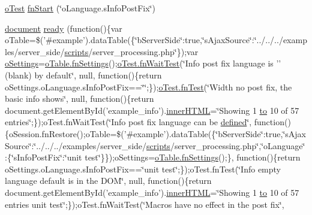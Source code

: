 \begin{DoxyCompactItemize}
\item 
\hyperlink{unit__test_8js_a3b2d259e2df3b6860d9047a92d09d0d6}{o\+Test} \hyperlink{4__server-side_2o_language_8s_info_post_fix_8js_a5a253c9710888be557d2745521cfb2e2}{fn\+Start} (\char`\"{}o\+Language.\+s\+Info\+Post\+Fix\char`\"{})
\item 
\hyperlink{outside_events_8js_aa14f8e0338cced6720590fd2ea13bd4b}{document} \hyperlink{4__server-side_2o_language_8s_info_post_fix_8js_a5b2040388b82b2aaf0cf84f047801834}{ready} (function()\{var o\+Table=\$('\#example').data\+Table(\{\char`\"{}b\+Server\+Side\char`\"{}\+:true,\char`\"{}s\+Ajax\+Source\char`\"{}\+:\char`\"{}../../../examples/server\+\_\+side/\hyperlink{tinymce_8jquery_8dev_8js_a09066d4d580eeec222f858d588b4cdef}{scripts}/server\+\_\+processing.\+php\char`\"{}\});var \hyperlink{model_8settings_8js_a4857b9c813b4dea010668e9555d0aca7}{o\+Settings}=\hyperlink{api_8methods_8js_a78f387fab92a85c2cb7830bc5d8a6141}{o\+Table.\+fn\+Settings}();\hyperlink{onhold_24__server-side_2__zero__config_8js_ab25c4d596771c0133cdc45178ce72c3d}{o\+Test.\+fn\+Wait\+Test}(\char`\"{}Info post fix language is '' (blank) by default\char`\"{}, null, function()\{return o\+Settings.\+o\+Language.\+s\+Info\+Post\+Fix==\char`\"{}\char`\"{};\});\hyperlink{__zero__config__objects__subarrays_8js_a7f100cfe8617a03cd30c47b5e15396a4}{o\+Test.\+fn\+Test}(\char`\"{}Width no post fix, the basic info shows\char`\"{}, null, function()\{return document.\+get\+Element\+By\+Id('example\+\_\+info').\hyperlink{jquery-ui_8js_a87f73c4f0391c1cf9fe60374a76d9a7b}{inner\+H\+T\+M\+L}=\char`\"{}Showing 1 \hyperlink{jquery-ui_8js_af6086621f45baa2cf538f19e45d3c263}{to} 10 of 57 entries\char`\"{};\});o\+Test.\+fn\+Wait\+Test(\char`\"{}Info post fix language can be \hyperlink{tinymce_8js_a8cb6212cde9926d156ab5912c9b547cf}{defined}\char`\"{}, function()\{o\+Session.\+fn\+Restore();o\+Table=\$('\#example').data\+Table(\{\char`\"{}b\+Server\+Side\char`\"{}\+:true,\char`\"{}s\+Ajax\+Source\char`\"{}\+:\char`\"{}../../../examples/server\+\_\+side/\hyperlink{tinymce_8jquery_8dev_8js_a09066d4d580eeec222f858d588b4cdef}{scripts}/server\+\_\+processing.\+php\char`\"{},\char`\"{}o\+Language\char`\"{}\+:\{\char`\"{}s\+Info\+Post\+Fix\char`\"{}\+:\char`\"{}unit test\char`\"{}\}\});o\+Settings=\hyperlink{api_8methods_8js_a78f387fab92a85c2cb7830bc5d8a6141}{o\+Table.\+fn\+Settings}();\}, function()\{return o\+Settings.\+o\+Language.\+s\+Info\+Post\+Fix==\char`\"{}unit test\char`\"{};\});o\+Test.\+fn\+Test(\char`\"{}Info empty language default is in the D\+O\+M\char`\"{}, null, function()\{return document.\+get\+Element\+By\+Id('example\+\_\+info').\hyperlink{jquery-ui_8js_a87f73c4f0391c1cf9fe60374a76d9a7b}{inner\+H\+T\+M\+L}=\char`\"{}Showing 1 \hyperlink{jquery-ui_8js_af6086621f45baa2cf538f19e45d3c263}{to} 10 of 57 entries unit test\char`\"{};\});o\+Test.\+fn\+Wait\+Test(\char`\"{}Macros have no effect in the post fix\char`\"{}, 
\end{DoxyCompactItemize}
